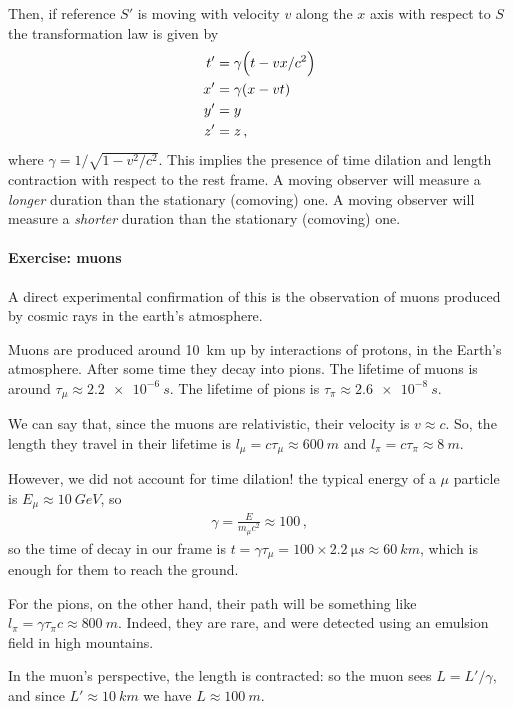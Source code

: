 \documentclass[main.tex]{subfiles}
\begin{document}
Then, if reference \(S'\) is moving with velocity \(v\) along the \(x\) axis with respect to \(S\) the transformation law is given by 
%
\begin{subequations}
\begin{align}
t' &= \gamma \qty(t - vx / c^2)  \\
x' &= \gamma \qty(x - vt)  \\
y' &= y  \\
z' &= z
\,,
\end{align}
\end{subequations}
%
where \(\gamma = 1 / \sqrt{ 1 -  v^2 / c^2}\).
This implies the presence of time dilation and length contraction with respect to the rest frame. 
A moving observer will measure a \emph{longer} duration than the stationary (comoving) one. 
A moving observer will measure a \emph{shorter} duration than the stationary (comoving) one.

\paragraph{Exercise: muons}

A direct experimental confirmation of this is the observation of muons produced by cosmic rays in the earth's atmosphere. 

Muons are produced around \SI{10}{km} up by interactions of protons, in the Earth's atmosphere. 
After some time they decay into pions. 
The lifetime of muons is around \(\tau_{\mu } \approx \SI{2.2e-6}{s}\). The lifetime of pions is \(\tau_{\pi } \approx \SI{2.6e-8}{s}\).

We can say that, since the muons are relativistic, their velocity is \(v \approx c\). So, the length they travel in their lifetime is \(l_{\mu } = c \tau_{\mu } \approx \SI{600}{m}\) and \(l_{\pi } = c \tau_{\pi } \approx \SI{8}{m}\). 

However, we did not account for time dilation! the typical energy of a \(\mu \) particle is \(E_{\mu } \approx \SI{10}{GeV}\), so 
%
\begin{align}
\gamma = \frac{E}{m_\mu c^2} \approx 100
\,,
\end{align}
%
so the time of decay in our frame is \(t = \gamma \tau_{\mu } = 100 \times \SI{2.2}{\micro s} \approx \SI{60}{km}\), which is enough for them to reach the ground.

For the pions, on the other hand, their path will be something like \(l_{\pi } = \gamma \tau_{\pi } c \approx
\SI{800}{m} \). Indeed, they are rare, and were detected using an emulsion field in high mountains. 

In the muon's perspective, the length is contracted: so the muon sees \(L = L' / \gamma \), and since \(L' \approx \SI{10}{km}\) we have  \(L \approx \SI{100}{m}\).
\end{document}
